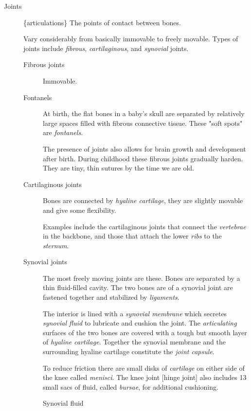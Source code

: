 \documentclass[11pt]{article}
\begin{document}
\begin{description}
\item[{Joints}] \{articulations\} The points of contact between bones.

Vary considerably from basically immovable to freely movable. Types of
joints include \emph{fibrous}, \emph{cartilaginous}, and \emph{synovial} joints.

\begin{description}
\item[{Fibrous joints}] Immovable.

\item[{Fontanels}] At birth, the flat bones in a baby's skull are separated by
relatively large spaces filled with fibrous connective tissue. These
"soft spots" are \emph{fontanels}.

The presence of joints also allows for brain growth and development
after birth. During childhood these fibrous joints gradually harden.
They are tiny, thin sutures by the time we are old.

\item[{Cartilaginous joints}] Bones are connected by \emph{hyaline cartilage}, they
are slightly movable and give some flexibility.

Examples include the cartilaginous joints that connect the
\emph{vertebrae} in the backbone, and those that attach the lower \emph{ribs}
to the \emph{sternum}.

\item[{Synovial joints}] The most freely moving joints are these. Bones are
separated by a thin fluid-filled cavity. The two bones are of a
synovial joint are fastened together and stabilized by \emph{ligaments}.

The interior is lined with a \emph{synovial membrane} which secretes
\emph{synovial fluid} to lubricate and cushion the joint. The
\emph{articulating} surfaces of the two bones are covered with a tough but
smooth layer of \emph{hyaline cartilage}. Together the synovial membrane
and the surrounding hyaline cartilage constitute the \emph{joint capsule}.

To reduce friction there are small disks of \emph{cartilage} on either
side of the knee called \emph{menisci}. The knee joint [hinge joint] also
includes 13 small sacs of fluid, called \emph{bursae}, for additional
cushioning.

\begin{description}
\item[{Synovial fluid}] 



\end{description}
\end{description}
\end{description}
\end{document}
